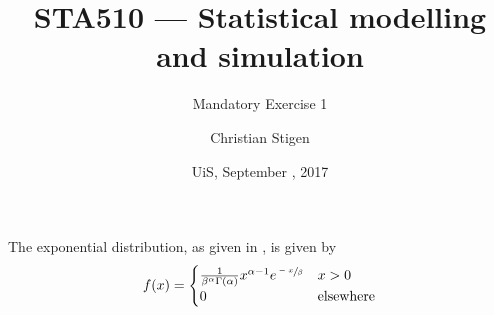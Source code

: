\documentclass[a4paper,english,12pt]{article}
\title{STA510 --- Statistical modelling and simulation}
\subtitle{Mandatory Exercise 1}
\author{Christian Stigen}
\date{UiS, September \nth{21}, 2017}
\begin{document}
\maketitle

The exponential distribution, as given in \cite{walpole}, is given by
\[
  f(x) =
    \begin{cases}
      \frac{1}{\beta^\alpha \Gamma(\alpha)} x^{\alpha - 1} e^{\sfrac{-x}{\beta}}
        & x > 0  \\
        0 & \text{elsewhere}
    \end{cases}
\]






\end{document}

